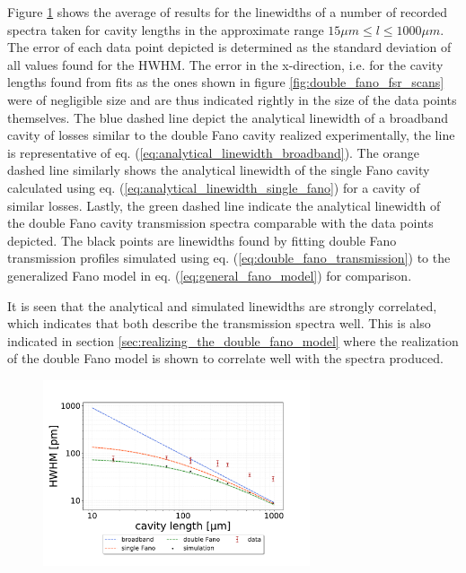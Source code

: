 Figure \ref{fig:HWHM_vs_l_double_fano_result} shows the average of results for the linewidths of a number of recorded spectra taken for cavity lengths in the approximate range $15 \mu m \leq l \leq 1000 \mu m$. The error of each data point depicted is determined as the standard deviation of all values found for the HWHM. The error in the x-direction, i.e. for the cavity lengths found from fits as the ones shown in figure \ref{fig:double_fano_fsr_scans} were of negligible size and are thus indicated rightly in the size of the data points themselves. The blue dashed line depict the analytical linewidth of a broadband cavity of losses similar to the double Fano cavity realized experimentally, the line is representative of eq. (\ref{eq:analytical_linewidth_broadband}). The orange dashed line similarly shows the analytical linewidth of the single Fano cavity calculated using eq. (\ref{eq:analytical_linewidth_single_fano}) for a cavity of similar losses. Lastly, the green dashed line indicate the analytical linewidth of the double Fano cavity transmission spectra comparable with the data points depicted. The black points are linewidths found by fitting double Fano transmission profiles simulated using eq. (\ref{eq:double_fano_transmission}) to the generalized Fano model in eq. (\ref{eq:general_fano_model}) for comparison.

It is seen that the analytical and simulated linewidths are strongly correlated, which indicates that both describe the transmission spectra well. This is also indicated in section \ref{sec:realizing_the_double_fano_model} where the realization of the double Fano model is shown to correlate well with the spectra produced. 

\begin{figure}[h!]
    \centering
    \includegraphics[width=0.7\textwidth]{figures/results/double fano fits/HWHM_vs_cavity_length_result.pdf}
    \caption{}
    \label{fig:HWHM_vs_l_double_fano_result}
\end{figure}

